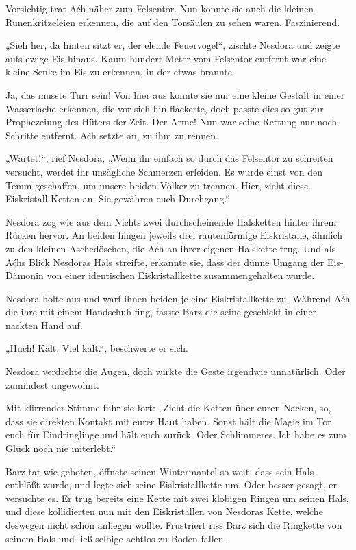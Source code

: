 Vorsichtig trat Aćh näher zum Felsentor. Nun konnte sie auch die kleinen Runenkritzeleien erkennen, die auf den Torsäulen zu sehen waren. Faszinierend.

„Sieh her, da hinten sitzt er, der elende Feuervogel“, zischte Nesdora und zeigte aufs ewige Eis hinaus. Kaum hundert Meter vom Felsentor entfernt war eine kleine Senke im Eis zu erkennen, in der etwas brannte.

Ja, das musste Turr sein! Von hier aus konnte sie nur eine kleine Gestalt in einer Wasserlache erkennen, die vor sich hin flackerte, doch passte dies so gut zur Prophezeiung des Hüters der Zeit. Der Arme! Nun war seine Rettung nur noch Schritte entfernt. Aćh setzte an, zu ihm zu rennen.

„Wartet!“, rief Nesdora, „Wenn ihr einfach so durch das Felsentor zu schreiten versucht, werdet ihr unsägliche Schmerzen erleiden. Es wurde einst von den Temm geschaffen, um unsere beiden Völker zu trennen. Hier, zieht diese Eiskristall-Ketten an. Sie gewähren euch Durchgang.“

Nesdora zog wie aus dem Nichts zwei durchscheinende Halsketten hinter ihrem Rücken hervor. An beiden hingen jeweils drei rautenförmige Eiskristalle, ähnlich zu den kleinen Aschedöschen, die Aćh an ihrer eigenen Halskette trug. Und als Aćhs Blick Nesdoras Hals streifte, erkannte sie, dass der dünne Umgang der Eis-Dämonin von einer identischen Eiskristallkette zusammengehalten wurde.

Nesdora holte aus und warf ihnen beiden je eine Eiskristallkette zu. Während Aćh die ihre mit einem Handschuh fing, fasste Barz die seine geschickt in einer nackten Hand auf.

„Huch! Kalt. Viel kalt.“, beschwerte er sich.

Nesdora verdrehte die Augen, doch wirkte die Geste irgendwie unnatürlich. Oder zumindest ungewohnt.

Mit klirrender Stimme fuhr sie fort: „Zieht die Ketten über euren Nacken, so, dass sie direkten Kontakt mit eurer Haut haben. Sonst hält die Magie im Tor euch für Eindringlinge und hält euch zurück. Oder Schlimmeres. Ich habe es zum Glück noch nie miterlebt.“

Barz tat wie geboten, öffnete seinen Wintermantel so weit, dass sein Hals entblößt wurde, und legte sich seine Eiskristallkette um. Oder besser gesagt, er versuchte es. Er trug bereits eine Kette mit zwei klobigen Ringen um seinen Hals, und diese kollidierten nun mit den Eiskristallen von Nesdoras Kette, welche deswegen nicht schön anliegen wollte. Frustriert riss Barz sich die Ringkette von seinem Hals und ließ selbige achtlos zu Boden fallen.


